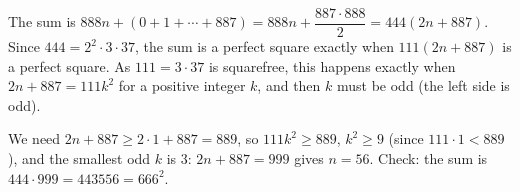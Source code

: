 The sum is $888n+(0+1+\cdots+887)=888n+\dfrac{887\cdot888}{2}=444(2n+887)$. Since $444=2^2\cdot3\cdot37$, the sum is a perfect square exactly when $111(2n+887)$ is a perfect square. As $111=3\cdot37$ is squarefree, this happens exactly when $2n+887=111k^2$ for a positive integer $k$, and then $k$ must be odd (the left side is odd).

We need $2n+887\ge2\cdot1+887=889$, so $111k^2\ge889$, $k^2\ge9$ (since $111\cdot1<889$), and the smallest odd $k$ is $3$: $2n+887=999$ gives $n=\boxed{56}$. Check: the sum is $444\cdot999=443556=666^2$.
